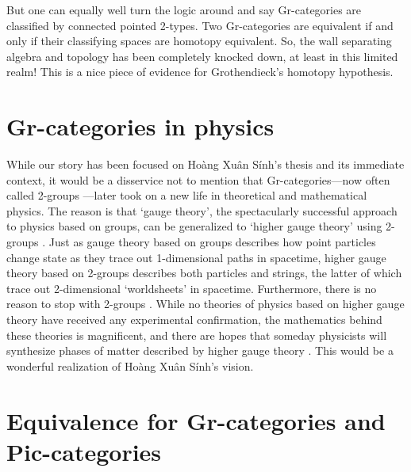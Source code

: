\documentclass[reqno,12pt]{amsart}
\theoremstyle{definition}
\begin{document}
But one can equally well turn the logic around and say Gr-categories are classified by connected pointed 2-types.  Two Gr-categories are equivalent if and only if their classifying spaces are homotopy equivalent.   So, the wall separating algebra and topology has been completely knocked down, at least in this limited realm!  This is a nice piece of evidence for Grothendieck's homotopy hypothesis.

\section{Gr-categories in physics}
\label{sec:physics}

While our story has been focused on Ho\`ang Xu\^an S\'inh's thesis and its immediate context, it would be a disservice not to mention that Gr-categories---now often called 2-groups \cite{BL04}---later took on a new life in theoretical and mathematical physics.   The reason is that `gauge theory', the spectacularly successful approach to physics based on groups, can be generalized to `higher gauge theory' using 2-groups \cite{BH11,BS06}.  Just as gauge theory based on groups describes how point particles change state as they trace out 1-dimensional paths in spacetime, higher gauge theory based on 2-groups describes both particles and strings, the latter of which trace out 2-dimensional `worldsheets' in spacetime.  Furthermore, there is no reason to stop with 2-groups \cite{NSS23,S13}.    While no theories of physics based on higher gauge theory have received any experimental confirmation, the mathematics behind these theories is magnificent, and there are hopes that someday physicists will synthesize phases of matter described by higher gauge theory \cite{BCHK22,BHKR21}.  This would be a wonderful realization of Ho\`ang Xu\^an S\'inh's vision.

\appendix
\section{Equivalence for Gr-categories and Pic-categories}
\label{appendix}
\end{document}
